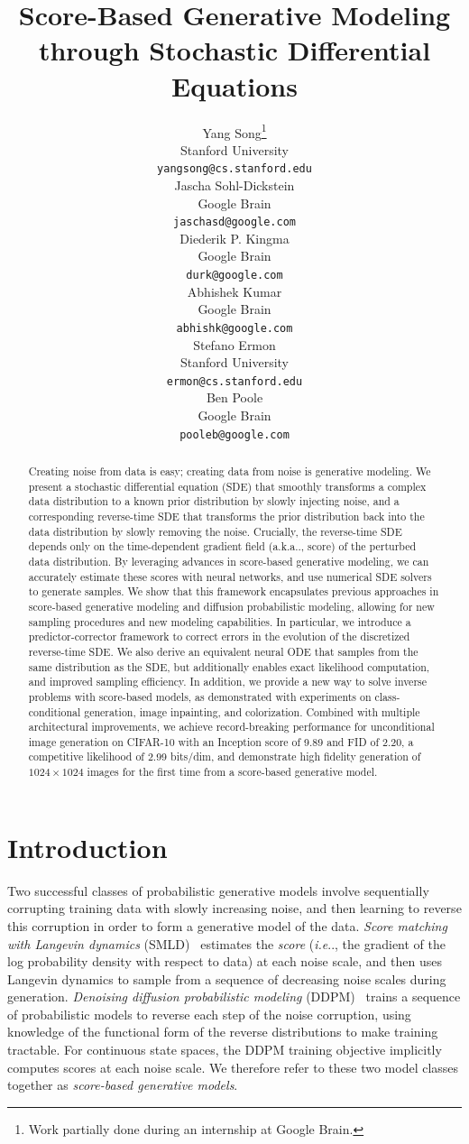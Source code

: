\documentclass{article} %
\title{Score-Based Generative Modeling through Stochastic Differential Equations}
\author{Yang Song\thanks{Work partially done during an internship at Google Brain.}\\
Stanford University\\
\texttt{yangsong@cs.stanford.edu}\\
\And 
Jascha Sohl-Dickstein\\
Google Brain\\
\texttt{jaschasd@google.com}\\
\And
Diederik P. Kingma \\
Google Brain\\
\texttt{durk@google.com}\\
\AND
Abhishek Kumar \\
Google Brain\\
\texttt{abhishk@google.com}\\
\And 
Stefano Ermon \\
Stanford University\\
\texttt{ermon@cs.stanford.edu}\\
\And
Ben Poole\\
Google Brain\\
\texttt{pooleb@google.com}
}
\makeatletter
\def\@onedot{\ifx\@let@token.\else.\null\fi\xspace}
\DeclareRobustCommand\onedot{\futurelet\@let@token\@onedot}
\def\ie{\emph{i.e}\onedot}
\def\aka{a.k.a\onedot}
\makeatother
\begin{document}
\maketitle

\begin{abstract}
Creating noise from data is easy; creating data from noise is generative modeling. We present a stochastic differential equation (SDE) that smoothly transforms a complex data distribution to a known prior distribution by slowly injecting noise, and a corresponding reverse-time SDE that transforms the prior distribution back into the data distribution by slowly removing the noise. 
Crucially, the reverse-time SDE depends only on the time-dependent gradient field (\aka, score) of the perturbed data distribution. By leveraging advances in score-based generative modeling, we can accurately estimate these scores with neural networks, and use numerical SDE solvers to generate samples. We show that this framework encapsulates previous approaches in score-based generative modeling and diffusion probabilistic modeling, allowing for new sampling procedures and new modeling capabilities. In particular, we introduce a predictor-corrector framework to correct errors in the evolution of the discretized reverse-time SDE. We also derive an equivalent neural ODE that samples from the same distribution as the SDE, but additionally enables exact likelihood computation, and improved sampling efficiency. In addition, we provide a new way to solve inverse problems with score-based models, 
as demonstrated with experiments on class-conditional generation, image inpainting, and colorization. Combined with multiple architectural improvements, we achieve record-breaking performance for unconditional image generation on CIFAR-10 with an Inception score of 9.89 and FID of 2.20, a competitive likelihood of 2.99 bits/dim, and demonstrate high fidelity generation of $1024\times 1024$ images for the first time from a score-based generative model.
\end{abstract}
\section{Introduction}



Two successful classes of probabilistic generative models involve sequentially corrupting training data with slowly increasing noise, and then learning to reverse this corruption in order to form a generative model of the data. 
\emph{Score matching with Langevin dynamics} (SMLD)~\citep{song2019generative} %
estimates the \emph{score} (\ie, the gradient of the log probability density with respect to data) at each noise scale, and then uses Langevin dynamics to sample from a sequence of decreasing noise scales during generation. 
\emph{Denoising diffusion probabilistic modeling} (DDPM)~\citep{sohl2015deep,ho2020denoising} trains a sequence of probabilistic models to reverse each step of the noise corruption, 
using knowledge of the functional form of the reverse distributions to make training tractable. 
For continuous state spaces, the DDPM training objective implicitly computes 
scores at each noise scale. 
We therefore refer to these two model classes together as \emph{score-based generative models}. %
\end{document}
